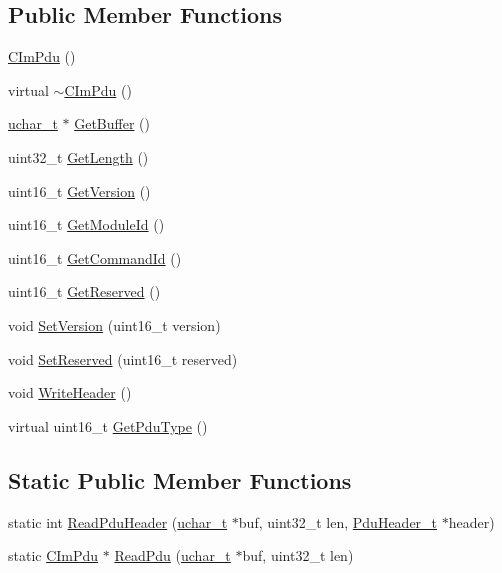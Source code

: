 \subsection*{Public Member Functions}
\begin{DoxyCompactItemize}
\item 
\hyperlink{class_c_im_pdu_ad5fa5ea457788a7334ef9acc79178167}{C\+Im\+Pdu} ()
\item 
virtual \hyperlink{class_c_im_pdu_a729723edff8942554282d9fc63167437}{$\sim$\+C\+Im\+Pdu} ()
\item 
\hyperlink{base_2ostype_8h_a124ea0f8f4a23a0a286b5582137f0b8d}{uchar\+\_\+t} $\ast$ \hyperlink{class_c_im_pdu_af315913facfaf60bed3749d1deb918d9}{Get\+Buffer} ()
\item 
uint32\+\_\+t \hyperlink{class_c_im_pdu_ae797ee364c1040c8d7d0d73576263a33}{Get\+Length} ()
\item 
uint16\+\_\+t \hyperlink{class_c_im_pdu_a7ae00635aaac44a54e2aad9709752a51}{Get\+Version} ()
\item 
uint16\+\_\+t \hyperlink{class_c_im_pdu_af15d6d80526c503bc7f470fc8665f067}{Get\+Module\+Id} ()
\item 
uint16\+\_\+t \hyperlink{class_c_im_pdu_a8da764933c49b8693f74769f4e4d777a}{Get\+Command\+Id} ()
\item 
uint16\+\_\+t \hyperlink{class_c_im_pdu_a403f59649bbfaab3a1161ca0d7ce7d94}{Get\+Reserved} ()
\item 
void \hyperlink{class_c_im_pdu_ae39818fc17601a79cd0ab27a4c0b9f6a}{Set\+Version} (uint16\+\_\+t version)
\item 
void \hyperlink{class_c_im_pdu_a19c73e79da7537e5eb54e1c4fcf1f116}{Set\+Reserved} (uint16\+\_\+t reserved)
\item 
void \hyperlink{class_c_im_pdu_a216e4bc0fa4a4a1e80fd7f8bba269a44}{Write\+Header} ()
\item 
virtual uint16\+\_\+t \hyperlink{class_c_im_pdu_a887912f445b3e864d33f9e7f2325f1fc}{Get\+Pdu\+Type} ()
\end{DoxyCompactItemize}
\subsection*{Static Public Member Functions}
\begin{DoxyCompactItemize}
\item 
static int \hyperlink{class_c_im_pdu_a702cc2fcd9a1031493c093bde6442a11}{Read\+Pdu\+Header} (\hyperlink{base_2ostype_8h_a124ea0f8f4a23a0a286b5582137f0b8d}{uchar\+\_\+t} $\ast$buf, uint32\+\_\+t len, \hyperlink{struct_pdu_header__t}{Pdu\+Header\+\_\+t} $\ast$header)
\item 
static \hyperlink{class_c_im_pdu}{C\+Im\+Pdu} $\ast$ \hyperlink{class_c_im_pdu_a12c8e78c595d25297fb461c12d3bcaae}{Read\+Pdu} (\hyperlink{base_2ostype_8h_a124ea0f8f4a23a0a286b5582137f0b8d}{uchar\+\_\+t} $\ast$buf, uint32\+\_\+t len)
\end{DoxyCompactItemize}
